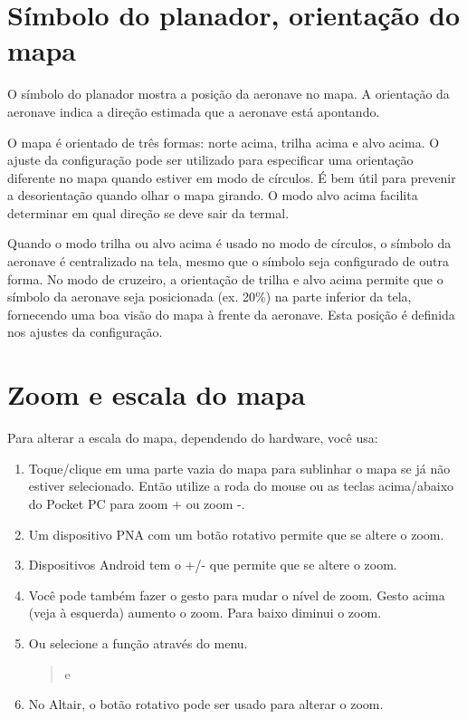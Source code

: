 \section{Símbolo do planador, orientação do mapa}
O símbolo do planador mostra a posição da aeronave no mapa.  A orientação da aeronave indica a direção estimada que a aeronave está apontando.

O mapa é orientado de três formas: norte acima, trilha acima e alvo acima.  O ajuste da configuração pode ser utilizado para especificar uma orientação diferente no mapa quando estiver em modo de círculos.  É bem útil para prevenir a desorientação quando olhar o mapa girando.  O modo alvo acima facilita determinar em qual direção se deve sair da termal.

Quando o modo trilha ou alvo acima é usado no modo de círculos, o símbolo da aeronave é centralizado na tela, mesmo que o símbolo seja configurado de outra forma.  No modo de cruzeiro, a orientação de trilha e alvo acima permite que o símbolo da aeronave seja posicionada (ex. 20\%) na parte inferior da tela, fornecendo uma boa visão do mapa à frente da aeronave.  Esta posição é definida nos ajustes da configuração.  

\section{Zoom e escala do mapa}\label{sec:zooming}

Para alterar a escala do mapa, dependendo do hardware, você usa:
\begin{enumerate}
\item Toque/clique em uma parte vazia do mapa para sublinhar o mapa se já não estiver selecionado.  Então utilize a roda do mouse ou as teclas acima/abaixo do Pocket PC para zoom + ou zoom -.
\item Um dispositivo PNA com um botão rotativo permite que se altere o zoom.
\item Dispositivos Android tem o +/- que permite que se altere o zoom.
\item Você pode também fazer o gesto para mudar o nível de zoom. Gesto acima (veja à esquerda) aumento o zoom.  Para baixo diminui o zoom.
\item Ou selecione a função através do menu.
\begin{quote}
\blink{} e 
\end{quote}
\item No Altair, o botão rotativo pode ser usado para alterar o zoom.
\end{enumerate}

